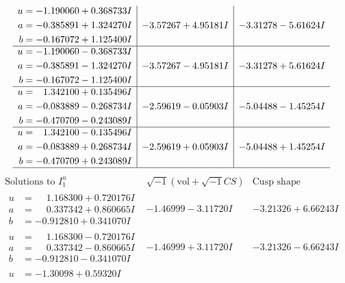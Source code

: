 \documentclass[1p]{elsarticle_modified}
\theoremstyle{definition}
\newcommand{\I}{\sqrt{-1}}
\begin{document}
$$\begin{array}{c|c|c}
\begin{aligned}
u &= -1.190060 + 0.368733 I \\
a &= -0.385891 + 1.324270 I \\
b &= -0.167072 + 1.125400 I\end{aligned}
 & -3.57267 + 4.95181 I & -3.31278 - 5.61624 I \\ \hline\begin{aligned}
u &= -1.190060 - 0.368733 I \\
a &= -0.385891 - 1.324270 I \\
b &= -0.167072 - 1.125400 I\end{aligned}
 & -3.57267 - 4.95181 I & -3.31278 + 5.61624 I \\ \hline\begin{aligned}
u &= \phantom{-}1.342100 + 0.135496 I \\
a &= -0.083889 - 0.268734 I \\
b &= -0.470709 - 0.243089 I\end{aligned}
 & -2.59619 - 0.05903 I & -5.04488 - 1.45254 I \\ \hline\begin{aligned}
u &= \phantom{-}1.342100 - 0.135496 I \\
a &= -0.083889 + 0.268734 I \\
b &= -0.470709 + 0.243089 I\end{aligned}
 & -2.59619 + 0.05903 I & -5.04488 + 1.45254 I\\
 \hline 
 \end{array}$$\newpage$$\begin{array}{c|c|c}  
\text{Solutions to }I^u_{1}& \I (\text{vol} + \sqrt{-1}CS) & \text{Cusp shape}\\
 \hline 
\begin{aligned}
u &= \phantom{-}1.168300 + 0.720176 I \\
a &= \phantom{-}0.337342 + 0.860665 I \\
b &= -0.912810 + 0.341070 I\end{aligned}
 & -1.46999 - 3.11720 I & -3.21326 + 6.66243 I \\ \hline\begin{aligned}
u &= \phantom{-}1.168300 - 0.720176 I \\
a &= \phantom{-}0.337342 - 0.860665 I \\
b &= -0.912810 - 0.341070 I\end{aligned}
 & -1.46999 + 3.11720 I & -3.21326 - 6.66243 I \\ \hline\begin{aligned}
u &= -1.30098 + 0.59320 I \\

\end{aligned}
\end{array}$$
\end{document}
